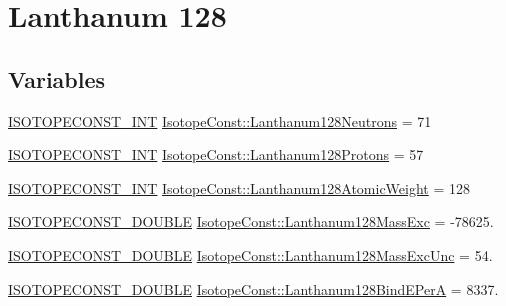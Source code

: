 \hypertarget{group___isotope_const-_lanthanum-_la128}{}\section{Lanthanum 128}
\label{group___isotope_const-_lanthanum-_la128}
\subsection*{Variables}
\begin{DoxyCompactItemize}
\item 
\mbox{\hyperlink{group___isotope_const-_macros_ga5f18360b3e99483a35c32d789e62621c}{I\+S\+O\+T\+O\+P\+E\+C\+O\+N\+S\+T\+\_\+\+I\+NT}} \mbox{\hyperlink{group___isotope_const-_lanthanum-_la128_ga5759e009ce926bce30824cff11426532}{Isotope\+Const\+::\+Lanthanum128\+Neutrons}} = 71
\item 
\mbox{\hyperlink{group___isotope_const-_macros_ga5f18360b3e99483a35c32d789e62621c}{I\+S\+O\+T\+O\+P\+E\+C\+O\+N\+S\+T\+\_\+\+I\+NT}} \mbox{\hyperlink{group___isotope_const-_lanthanum-_la128_gac9fb4a3949e07cba2e0b253094a1797a}{Isotope\+Const\+::\+Lanthanum128\+Protons}} = 57
\item 
\mbox{\hyperlink{group___isotope_const-_macros_ga5f18360b3e99483a35c32d789e62621c}{I\+S\+O\+T\+O\+P\+E\+C\+O\+N\+S\+T\+\_\+\+I\+NT}} \mbox{\hyperlink{group___isotope_const-_lanthanum-_la128_ga8385d7b533abaa6836e7074ca15e3aca}{Isotope\+Const\+::\+Lanthanum128\+Atomic\+Weight}} = 128
\item 
\mbox{\hyperlink{group___isotope_const-_macros_ga8f45a7272ce02c0b4c65c44636ed719a}{I\+S\+O\+T\+O\+P\+E\+C\+O\+N\+S\+T\+\_\+\+D\+O\+U\+B\+LE}} \mbox{\hyperlink{group___isotope_const-_lanthanum-_la128_ga094e15d871993767372fb0081e22d4fe}{Isotope\+Const\+::\+Lanthanum128\+Mass\+Exc}} = -\/78625.
\item 
\mbox{\hyperlink{group___isotope_const-_macros_ga8f45a7272ce02c0b4c65c44636ed719a}{I\+S\+O\+T\+O\+P\+E\+C\+O\+N\+S\+T\+\_\+\+D\+O\+U\+B\+LE}} \mbox{\hyperlink{group___isotope_const-_lanthanum-_la128_ga801610c56eb493ada68abbeb61b73b7d}{Isotope\+Const\+::\+Lanthanum128\+Mass\+Exc\+Unc}} = 54.
\item 
\mbox{\hyperlink{group___isotope_const-_macros_ga8f45a7272ce02c0b4c65c44636ed719a}{I\+S\+O\+T\+O\+P\+E\+C\+O\+N\+S\+T\+\_\+\+D\+O\+U\+B\+LE}} \mbox{\hyperlink{group___isotope_const-_lanthanum-_la128_gacebe077fac902a1bc4ab19fbc09bda81}{Isotope\+Const\+::\+Lanthanum128\+Bind\+E\+PerA}} = 8337.
\item 

\end{DoxyCompactItemize}

